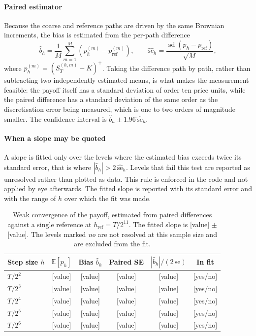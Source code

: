 \documentclass[11pt,a4paper]{article}
\theoremstyle{definition}
\theoremstyle{remark}
\begin{document}
\paragraph{Paired estimator}
Because the coarse and reference paths are driven by the same Brownian increments, the bias is estimated from the per-path difference
\begin{equation}
    \hat{b}_h = \frac{1}{M} \sum_{m=1}^{M} \left( p_h^{(m)} - p_{\mathrm{ref}}^{(m)} \right),
    \qquad
    \widehat{\mathrm{se}}_h = \frac{\operatorname{sd}\!\left( p_h - p_{\mathrm{ref}} \right)}{\sqrt{M}},
    \label{eq:paired-bias}
\end{equation}
where $p_h^{(m)} = (S_T^{(h,m)} - K)^+$. Taking the difference path by path, rather than subtracting two independently estimated means, is what makes the measurement feasible: the payoff itself has a standard deviation of order ten price units, while the paired difference has a standard deviation of the same order as the discretisation error being measured, which is one to two orders of magnitude smaller. The confidence interval is $\hat{b}_h \pm 1.96\, \widehat{\mathrm{se}}_h$.

\paragraph{When a slope may be quoted}
A slope is fitted only over the levels where the estimated bias exceeds twice its standard error, that is where $\left| \hat{b}_h \right| > 2\, \widehat{\mathrm{se}}_h$. Levels that fail this test are reported as unresolved rather than plotted as data. This rule is enforced in the code and not applied by eye afterwards. The fitted slope is reported with its standard error and with the range of $h$ over which the fit was made.

\begin{table}[H]
\centering
\begin{tabular}{lccccc}
\toprule
\textbf{Step size $h$} & \textbf{$\mathbb{E}[p_h]$} & \textbf{Bias $\hat{b}_h$}
    & \textbf{Paired SE} & \textbf{$\left| \hat{b}_h \right| / (2\,\mathrm{se})$}
    & \textbf{In fit} \\
\midrule
$T/2^{2}$  & [value] & [value] & [value] & [value] & [yes/no] \\
$T/2^{3}$  & [value] & [value] & [value] & [value] & [yes/no] \\
$T/2^{4}$  & [value] & [value] & [value] & [value] & [yes/no] \\
$T/2^{5}$  & [value] & [value] & [value] & [value] & [yes/no] \\
$T/2^{6}$  & [value] & [value] & [value] & [value] & [yes/no] \\
\bottomrule
\end{tabular}
\caption{Weak convergence of the payoff, estimated from paired differences
against a single reference at $h_{\mathrm{ref}} = T/2^{11}$. The fitted slope is
[value] $\pm$ [value]. The levels marked \emph{no} are not resolved at this
sample size and are excluded from the fit.}
\label{tab:weak}
\end{table}
\end{document}
